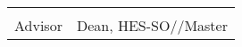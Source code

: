 { \renewcommand{\arraystretch}{1.5}
 \begin{tabularx}{\textwidth}{X X}
 	\Advisor  & \Dean\\
 	Advisor   & Dean, HES-SO//Master\\
 \end{tabularx}
 }

%
%
%
%
%
%
%
%
%
%
%
%
%
%
%
%
%
%
%
